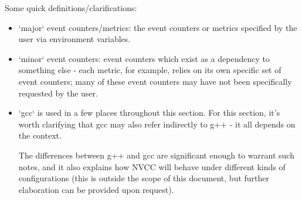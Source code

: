 \documentclass[8pt, a4paper, twoside, twoclumn, english]{extreport}
\begin{document}
\begin {flushleft}
  Some quick definitions/clarifications:
  \begin {itemize}
  \item `major` event counters/metrics: the event counters or metrics
    specified by the user via environment variables.
  \item `minor` event counters: event counters which exist as a dependency
    to something else - each metric, for example, relies on its own specific set of event counters;
    many of these event counters may have not been specifically requested by the user.
  \item `gcc` is used in a few places throughout this section. For this section, it's worth clarifying that
    gcc may also refer indirectly to g++ - it all depends on the context.

    The differences between g++ and gcc are significant enough to warrant such notes, and it
    also explains how NVCC will behave under different kinds of configurations (this is outside
    the scope of this document, but further elaboration can be provided upon request).
  \end{itemize}
\end{flushleft}
\end{document}
